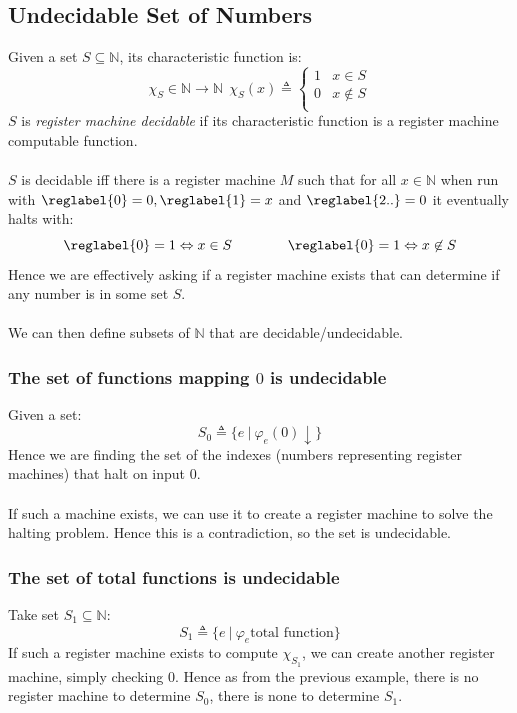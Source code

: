 \subsection{Undecidable Set of Numbers}
Given a set $S \subseteq \mathbb{N}$, its characteristic function is:
\[\chi_S \in \mathbb{N} \to \mathbb{N} \ \ \chi_S(x) \triangleq \begin{cases}
		1 & x \in S     \\
		0 & x \not\in S \\
	\end{cases}\]
$S$ is \textit{register machine decidable} if its characteristic function is a register machine computable function.
\\
\\ $S$ is decidable iff there is a register machine $M$ such that for all $x \in \mathbb{N}$ when run with $\reglabel{0} = 0, \reglabel{1} = x$ and $\reglabel{2..} = 0$ it eventually halts with:
\[\reglabel{0} = 1 \Leftrightarrow x \in S \qquad \qquad \reglabel{0} = 1 \Leftrightarrow x \not\in S \]
Hence we are effectively asking if a register machine exists that can determine if any number is in some set $S$.
\\
\\ We can then define subsets of $\mathbb{N}$ that are decidable/undecidable.

\subsubsection{The set of functions mapping $0$ is undecidable}
Given a set:
\[S_0 \triangleq \{e \ | \ \varphi_e(0)\downarrow\}\]
Hence we are finding the set of the indexes (numbers representing register machines) that halt on input $0$.
\\
\\ If such a machine exists, we can use it to create a register machine to solve the halting problem. Hence this is a contradiction, so the set is undecidable.

\subsubsection{The set of total functions is undecidable}
Take set $S_1 \subseteq \mathbb{N}$:
\[S_1 \triangleq \{e \ | \ \varphi_e\text{total function}\}\]
If such a register machine exists to compute $\chi_{S_1}$, we can create another register machine, simply checking $0$. Hence as from the previous example, there is no register machine to determine $S_0$, there is none to determine $S_1$.


